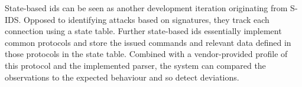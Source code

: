 State-based \gls{ids} can be seen as another development iteration originating from S-IDS. Opposed to identifying attacks based on signatures, they track each connection using a state table. Further state-based \gls{ids} essentially implement common protocols and store the issued commands and relevant data defined in those protocols in the state table.
Combined with a vendor-provided profile of this protocol and the implemented parser, the system can compared the observations to the expected behaviour and so detect deviations. \parencite[p.~306]{Whitman2009}


